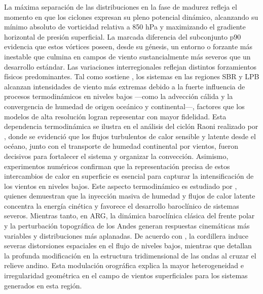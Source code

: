 La máxima separación de las distribuciones en la fase de madurez refleja el momento en que los ciclones expresan su pleno potencial dinámico, alcanzando su mínimo absoluto de vorticidad relativa a 850 hPa y maximizando el gradiente horizontal de presión superficial. La marcada diferencia del subconjunto p90 evidencia que estos vórtices poseen, desde su génesis, un entorno o forzante más inestable que culmina en campos de viento sustancialmente más severos que un desarrollo estándar. 
Las variaciones interregionales reflejan distintos forzamientos físicos predominantes. Tal como sostiene \citet{gramcianinov2024early}, los sistemas en las regiones SBR y LPB alcanzan intensidades de viento más extremas debido a la fuerte influencia de procesos termodinámicos en niveles bajos —como la advección cálida y la convergencia de humedad de origen oceánico y continental—, factores que los modelos de alta resolución logran representar con mayor fidelidad. Esta dependencia termodinámica se ilustra en el análisis del ciclón Raoni realizado por \citet{reboita2022from}, donde se evidenció que los flujos turbulentos de calor sensible y latente desde el océano, junto con el transporte de humedad continental por vientos, fueron decisivos para fortalecer el sistema y organizar la convección. Asimismo, experimentos numéricos confirman que la representación precisa de estos intercambios de calor en superficie es esencial para capturar la intensificación de los vientos en niveles bajos. Este aspecto termodinámico es estudiado por \citet{russo2025impacts}, quienes demuestran que la inyección masiva de humedad y flujos de calor latente concentra la energía cinética y favorece el desarrollo baroclínico de sistemas severos.
Mientras tanto, en ARG, la dinámica baroclínica clásica del frente polar y la perturbación topográfica de los Andes generan respuestas cinemáticas más variables y distribuciones más aplanadas. De acuerdo con \citet{gan1994influence}, la cordillera induce severas distorsiones espaciales en el flujo de niveles bajos, mientras que \citet{vera2002cold} detallan la profunda modificación en la estructura tridimensional de las ondas al cruzar el relieve andino. Esta modulación orográfica explica la mayor heterogeneidad e irregularidad geométrica en el campo de vientos superficiales para los sistemas generados en esta región.
